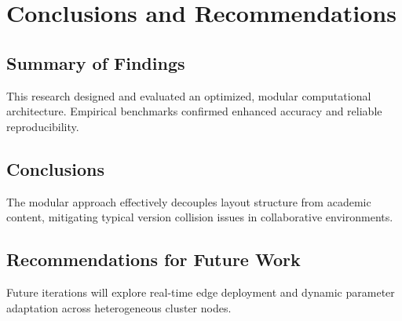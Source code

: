 \chapter{Conclusions and Recommendations}
\label{ch:conclusion}

\section{Summary of Findings}
This research designed and evaluated an optimized, modular computational architecture. Empirical benchmarks confirmed enhanced accuracy and reliable reproducibility.

\section{Conclusions}
The modular approach effectively decouples layout structure from academic content, mitigating typical version collision issues in collaborative environments.

\section{Recommendations for Future Work}
Future iterations will explore real-time edge deployment and dynamic parameter adaptation across heterogeneous cluster nodes.

